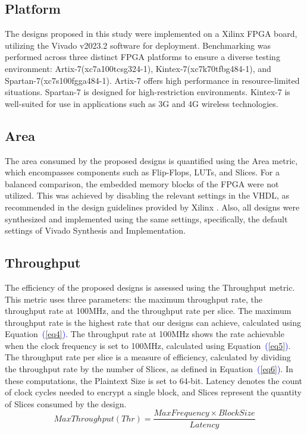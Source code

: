 \documentclass[final,5p,times,twocolumn]{elsarticle}
\begin{document}
\subsection{Platform}\label{subsec4}

The designs proposed in this study were implemented on a Xilinx FPGA board, utilizing the Vivado v2023.2 software for deployment.
Benchmarking was performed across three distinct FPGA platforms to ensure a diverse testing environment: Artix-7(xc7a100tcsg324-1), Kintex-7(xc7k70tfbg484-1), and Spartan-7(xc7s100fgga484-1).
Artix-7 offers high performance in resource-limited situations. Spartan-7 is designed for high-restriction environments. Kintex-7 is well-suited for use in applications such as 3G and 4G wireless technologies.


\subsection{Area}\label{subsec5}

The area consumed by the proposed designs is quantified using the Area metric, which encompasses components such as Flip-Flops, LUTs, and Slices.
For a balanced comparison, the embedded memory blocks of the FPGA were not utilized.
This was achieved by disabling the relevant settings in the VHDL, as recommended in the design guidelines provided by Xilinx \cite{xilinx2022ultrafast}.
Also, all designs were synthesized and implemented using the same settings, specifically, the default settings of Vivado Synthesis and Implementation.

\subsection{Throughput}\label{subsec6}
The efficiency of the proposed designs is assessed using the Throughput metric.
This metric uses three parameters: the maximum throughput rate, the throughput rate at 100MHz, and the throughput rate per slice.
The maximum throughput rate is the highest rate that our designs can achieve, calculated using Equation~\textcolor{blue}{(\ref{eq4})}.
The throughput rate at 100MHz shows the rate achievable when the clock frequency is set to 100MHz, calculated using Equation~\textcolor{blue}{(\ref{eq5})}.
The throughput rate per slice is a measure of efficiency, calculated by dividing the throughput rate by the number of Slices, as defined in Equation~\textcolor{blue}{(\ref{eq6})}.
In these computations, the Plaintext Size is set to 64-bit.
Latency denotes the count of clock cycles needed to encrypt a single block, and Slices represent the quantity of Slices consumed by the design.
\begin{equation}
    MaxThroughput(Thr) = \frac{MaxFrequency \times Block Size}{Latency}
    \label{eq4}
\end{equation}
\end{document}
